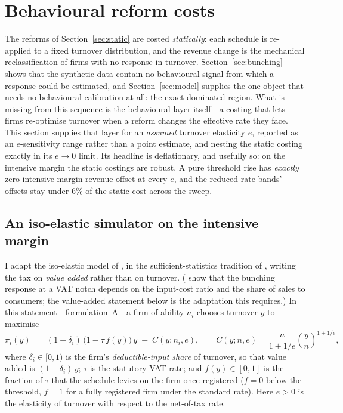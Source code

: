 \section{Behavioural reform costs}
\label{sec:behavioural}

The reforms of Section~\ref{sec:static} are costed \emph{statically}: each
schedule is re-applied to a fixed turnover distribution, and the revenue change is
the mechanical reclassification of firms with no response in turnover.
Section~\ref{sec:bunching} shows that the synthetic data contain no behavioural
signal from which a response could be estimated, and Section~\ref{sec:model}
supplies the one object that needs no behavioural calibration at all: the exact
dominated region. What is missing from this sequence is the behavioural layer
itself---a costing that lets firms re-optimise turnover when a reform changes the
effective rate they face. This section supplies that layer for an \emph{assumed}
turnover elasticity $e$, reported as an $e$-sensitivity range rather than a point
estimate, and nesting the static costing exactly in its $e\to0$ limit. Its
headline is deflationary, and usefully so: on the intensive margin the static
costings are robust. A pure threshold rise has \emph{exactly} zero
intensive-margin revenue offset at every $e$, and the reduced-rate bands' offsets
stay under $6\%$ of the static cost across the sweep.

\subsection{An iso-elastic simulator on the intensive margin}
\label{ssec:simulator}

I adapt the iso-elastic model of \citet{klevenwaseem2013}, in the
sufficient-statistics tradition of \citet{saez2010}, writing the tax on
\emph{value added} rather than on turnover. (\citet{liuetal2021} show that the
bunching response at a VAT notch depends on the input-cost ratio and the share
of sales to consumers; the value-added statement below is the adaptation this
requires.) In this statement---formulation~A---a firm of ability $n_i$ chooses
turnover $y$ to maximise
\begin{equation}
  \pi_i(y) \;=\; (1-\delta_i)\,\bigl(1-\tau\,f(y)\bigr)\,y \;-\;
  C(y;n_i,e), \qquad
  C(y;n,e)=\frac{n}{1+1/e}\left(\frac{y}{n}\right)^{1+1/e},
  \label{eq:isoelastic}
\end{equation}
where $\delta_i\in[0,1)$ is the firm's \emph{deductible-input share} of turnover,
so that value added is $(1-\delta_i)\,y$; $\tau$ is the statutory VAT rate; and
$f(y)\in[0,1]$ is the fraction of $\tau$ that the schedule levies on the firm once
registered ($f=0$ below the threshold, $f=1$ for a fully registered firm under the
standard rate). Here $e>0$ is the elasticity of turnover with respect to the
net-of-tax rate.

